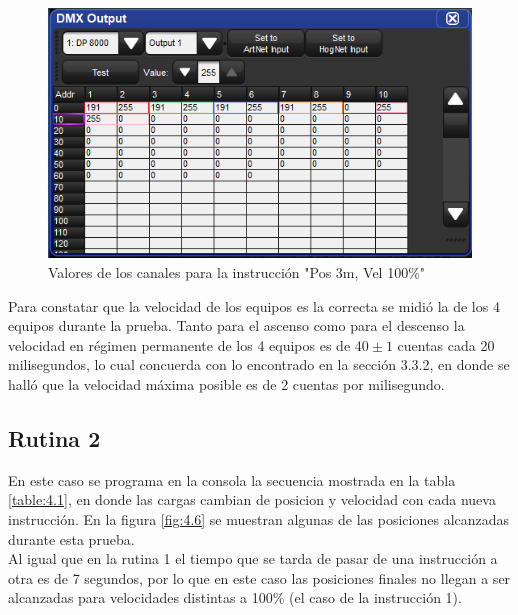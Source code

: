 \begin{figure}[!ht]
	\centering
	\includegraphics[width=16cm,scale=1]{resources/4_5-cuelist1_cue2.png}
	\caption{Valores de los canales para la instrucción "Pos 3m, Vel 100\%"}
	\label{fig:\thefigure}
\end{figure}

Para constatar que la velocidad de los equipos es la correcta se midió la de los 4 equipos durante la prueba. Tanto para el ascenso como para el descenso la velocidad en régimen permanente de los 4 equipos es de \(40 \pm 1\) cuentas cada 20 milisegundos, lo cual concuerda con lo encontrado en la sección 3.3.2, en donde se halló que la velocidad máxima posible es de 2 cuentas por milisegundo.

\subsection{Rutina 2}
En este caso se programa en la consola la secuencia mostrada en la tabla \ref{table:4.1}, en donde las cargas cambian de posicion y velocidad con cada nueva instrucción. En la figura \ref{fig:4.6} se muestran algunas de las posiciones alcanzadas durante esta prueba. \\
Al igual que en la rutina 1 el tiempo que se tarda de pasar de una instrucción a otra es de 7 segundos, por lo que en este caso las posiciones finales no llegan a ser alcanzadas para velocidades distintas a 100\% (el caso de la instrucción 1).

